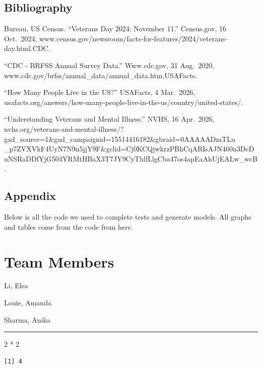 \documentclass[
  10pt,
  letterpaper,
  DIV=11,
  numbers=noendperiod]{scrartcl}
\newenvironment{Shaded}{\begin{snugshade}}{\end{snugshade}}
\newcommand{\DecValTok}[1]{\textcolor[rgb]{0.68,0.00,0.00}{#1}}
\newcommand{\SpecialCharTok}[1]{\textcolor[rgb]{0.37,0.37,0.37}{#1}}
\begin{document}
\newpage

\subsection{Bibliography}\label{bibliography}

Bureau, US Census. ``Veterans Day 2024: November 11.'' Census.gov, 16
Oct.~2024,
www.census.gov/newsroom/facts-for-features/2024/veterans-day.html.CDC.

``CDC - BRFSS Annual Survey Data.'' Www.cdc.gov, 31 Aug.~2020,
www.cdc.gov/brfss/annual\_data/annual\_data.htm.USAFacts.

``How Many People Live in the US?'' USAFacts, 4 Mar.~2026,
usafacts.org/answers/how-many-people-live-in-the-us/country/united-states/.

``Understanding Veterans and Mental Illness.'' NVHS, 16 Apr.~2026,
nvhs.org/veterans-and-mental-illness/?gad\_source=1\&gad\_campaignid=15514416182\&gbraid=0AAAAADmTLu
\_p7ZVXVkF4UyN7N9n5jjY9F\&gclid=Cj0KCQjwkrzPBhCqARIsAJN460n3DcDuNSRaDDfYjG504YRMtHBaX3T7JY9CyThlfLlgCba47os4apEaAhUjEALw\_wcB.

\subsection{Appendix}\label{appendix}

Below is all the code we used to complete tests and generate models. All
graphs and tables come from the code from here.

\section{Team Members}\label{team-members}

Li, Elsa

Louie, Amanda

Sharma, Anika

\begin{center}\rule{0.5\linewidth}{0.5pt}\end{center}

\begin{Shaded}
\begin{Highlighting}[]
\DecValTok{2} \SpecialCharTok{*} \DecValTok{2}
\end{Highlighting}
\end{Shaded}

\begin{verbatim}
[1] 4
\end{verbatim}
\end{document}
